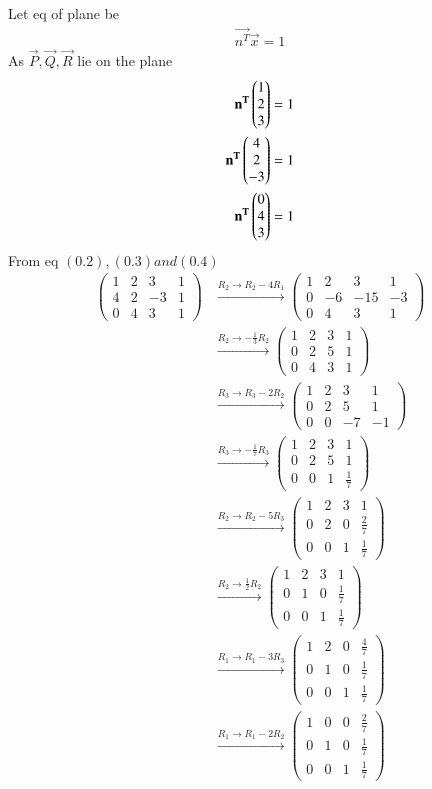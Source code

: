 \documentclass[journal]{IEEEtran}
\newcommand{\augvec}[3]{%
  \left(\begin{array}{*{#1}{c}|*{#2}{c}}
  #3
  \end{array}\right)}
\begin{document}
Let eq of plane be
\begin{align}
    \vec{n^T}\vec{x}=1
\end{align}
As $\vec{P},\vec{Q},\vec{R}$ lie on the plane
\begin{align}
 \mathbf{n^T}
 \begin{pmatrix}1
        \\
        2
        \\
        3
 \end{pmatrix}=1\\
  \mathbf{n^T}
 \begin{pmatrix}4
        \\
        2
        \\
        -3
 \end{pmatrix}=1\\
  \mathbf{n^T}
 \begin{pmatrix}0
        \\
        4
        \\
        3
 \end{pmatrix}=1
 \end{align}
From eq $(0.2),(0.3) and (0.4)$
\begin{align}
\augvec{3}{1}{
1 & 2 & 3 & 1 \\
4 & 2 & -3 & 1 \\
0 & 4 & 3 & 1}
&\xrightarrow{R_2 \to R_2 - 4R_1}
\augvec{3}{1}{
1 & 2 & 3 & 1 \\
0 & -6 & -15 & -3 \\
0 & 4 & 3 & 1} \\[6pt]
&\xrightarrow{R_2 \to -\tfrac{1}{3}R_2}
\augvec{3}{1}{
1 & 2 & 3 & 1 \\
0 & 2 & 5 & 1 \\
0 & 4 & 3 & 1} \\[6pt]
&\xrightarrow{R_3 \to R_3 - 2R_2}
\augvec{3}{1}{
1 & 2 & 3 & 1 \\
0 & 2 & 5 & 1 \\
0 & 0 & -7 & -1} \\[6pt]
&\xrightarrow{R_3 \to -\tfrac{1}{7}R_3}
\augvec{3}{1}{
1 & 2 & 3 & 1 \\
0 & 2 & 5 & 1 \\
0 & 0 & 1 & \tfrac{1}{7}} \\[6pt]
&\xrightarrow{R_2 \to R_2 - 5R_3}
\augvec{3}{1}{
1 & 2 & 3 & 1 \\
0 & 2 & 0 & \tfrac{2}{7} \\
0 & 0 & 1 & \tfrac{1}{7}} \\[6pt]
&\xrightarrow{R_2 \to \tfrac{1}{2}R_2}
\augvec{3}{1}{
1 & 2 & 3 & 1 \\
0 & 1 & 0 & \tfrac{1}{7} \\
0 & 0 & 1 & \tfrac{1}{7}} \\[6pt]
&\xrightarrow{R_1 \to R_1 - 3R_3}
\augvec{3}{1}{
1 & 2 & 0 & \tfrac{4}{7} \\
0 & 1 & 0 & \tfrac{1}{7} \\
0 & 0 & 1 & \tfrac{1}{7}} \\[6pt]
&\xrightarrow{R_1 \to R_1 - 2R_2}
\augvec{3}{1}{
1 & 0 & 0 & \tfrac{2}{7} \\
0 & 1 & 0 & \tfrac{1}{7} \\
0 & 0 & 1 & \tfrac{1}{7}
}
\end{align}
\end{document}
